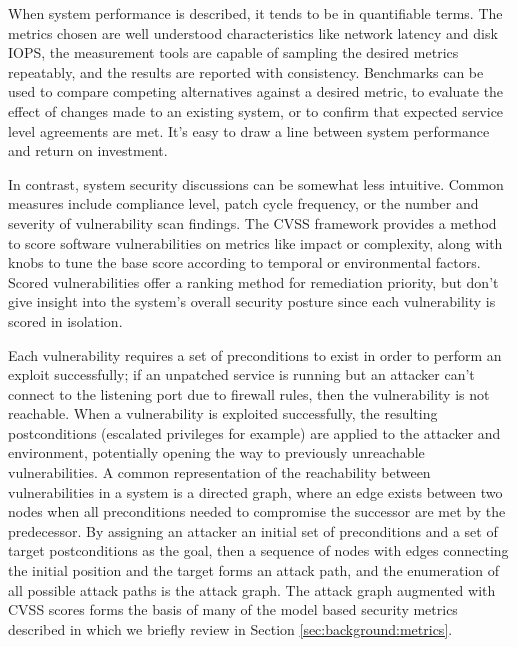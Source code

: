 


When system performance is described, it tends to be in quantifiable terms. The metrics chosen are well understood characteristics like network latency and disk IOPS, the measurement tools are capable of sampling the desired metrics repeatably, and the results are reported with consistency. Benchmarks can be used to compare competing alternatives against a desired metric, to evaluate the effect of changes made to an existing system, or to confirm that expected service level agreements are met. It's easy to draw a line between system performance and return on investment.

In contrast, system security discussions can be somewhat less intuitive. Common measures include compliance level, patch cycle frequency, or the number and severity of vulnerability scan findings. The CVSS\cite{Mell07thecommon} framework provides a method to score software vulnerabilities on metrics like impact or complexity, along with knobs to tune the base score according to temporal or environmental factors. Scored vulnerabilities offer a ranking method for remediation priority, but don't give insight into the system's overall security posture since each vulnerability is scored in isolation. 

Each vulnerability requires a set of preconditions to exist in order to perform an exploit successfully; if an unpatched service is running but an attacker can't connect to the listening port due to firewall rules, then the vulnerability is not reachable. When a vulnerability is exploited successfully, the resulting postconditions (escalated privileges for example) are applied to the attacker and environment, potentially opening the way to previously unreachable vulnerabilities. A common representation of the reachability between vulnerabilities in a system is a directed graph, where an edge exists between two nodes when all preconditions needed to compromise the successor are met by the predecessor. By assigning an attacker an initial set of preconditions and a set of target postconditions as the goal, then a sequence of nodes with edges connecting the initial position and the target forms an attack path, and the enumeration of all possible attack paths is the attack graph. The attack graph augmented with CVSS scores forms the basis of many of the model based security metrics described in \cite{Pendleton_Garcia-Lebron_Cho_Xu_2016}\cite{Ramos_Lazar_Filho_Rodrigues_2017}\cite{Verendel_2009} which we briefly review in Section \ref{sec:background:metrics}.

